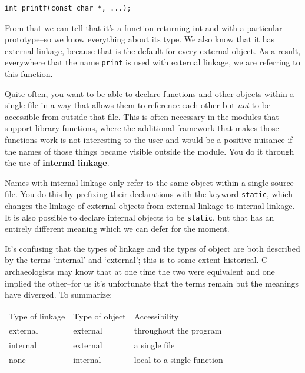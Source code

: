 \begin{Verbatim}
int printf(const char *, ...);
\end{Verbatim}

  From that we can tell that it's a function returning int and with a
   particular prototype--so we know everything about its type. We also
   know that it has external linkage, because that is the default for every
   external object. As a result, everywhere that the name \texttt{print}
   is used with external linkage, we are referring to this function.


  Quite often, you want to be able to declare functions and other objects
   within a single file in a way that allows them to reference each other
   but \textit{not} to be accessible from outside that file. This is often
   necessary in the modules that support library functions, where the
   additional framework that makes those functions work is not interesting
   to the user and would be a positive nuisance if the names of those things
   became visible outside the module. You do it through the use of
   \textbf{internal linkage}.


  Names with internal linkage only refer to the same object within a
   single source file. You do this by prefixing their declarations with the
   keyword \texttt{static}, which changes the linkage of external
   objects from external linkage to internal linkage. It is also possible to
   declare internal objects to be \texttt{static}, but that has an
   entirely different meaning which we can defer for the moment.


  It's confusing that the types of linkage and the types of object are
   both described by the terms `internal' and `external'; this
   is to some extent historical. C archaeologists may know that at one time
   the two were equivalent and one implied the other--for us it's
   unfortunate that the terms remain but the meanings have diverged. To
   summarize:


  \begin{tabular}{llp{\textwidth}}
    Type of linkage & Type of object & Accessibility
   \\

    external & external & throughout the program
   \\

    internal & external & a single file
   \\

    none & internal & local to a single function
   \\
\end{tabular}

